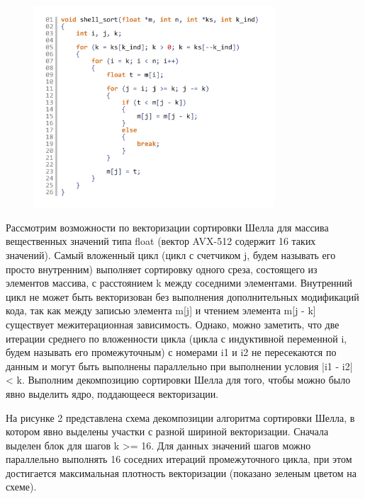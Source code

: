 \begin{figure}[ht]
	\centering
		\includegraphics[width=0.8\textwidth]{./pics/text_4_vec_irreg/shell_code.pdf}
	\caption{}
	\label{fig:text_4_vec_irreg_shell_code}
\end{figure}

Рассмотрим возможности по векторизации сортировки Шелла для массива вещественных значений типа float (вектор AVX-512 содержит 16 таких значений).
Самый вложенный цикл (цикл с счетчиком j, будем называть его просто внутренним) выполняет сортировку одного среза, состоящего из элементов массива, с расстоянием k между соседними элементами.
Внутренний цикл не может быть векторизован без выполнения дополнительных модификаций кода, так как между записью элемента m[j] и чтением элемента m[j - k] существует межитерационная зависимость.
Однако, можно заметить, что две итерации среднего по вложенности цикла (цикла с индуктивной переменной i, будем называть его промежуточным) с номерами i1 и i2 не пересекаются по данным и могут быть выполнены параллельно при выполнении условия |i1 - i2| < k.
Выполним декомпозицию сортировки Шелла для того, чтобы можно было явно выделить ядро, поддающееся векторизации.

На рисунке 2 представлена схема декомпозиции алгоритма сортировки Шелла, в котором явно выделены участки с разной шириной векторизации. Сначала выделен блок для шагов k >= 16.
Для данных значений шагов можно параллельно выполнять 16 соседних итераций промежуточного цикла, при этом достигается максимальная плотность векторизации (показано зеленым цветом на схеме).


